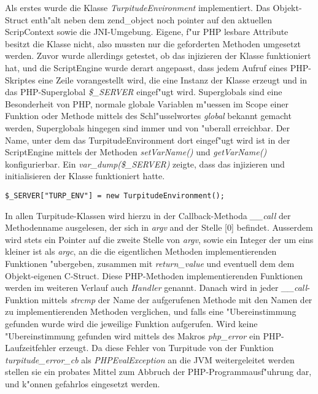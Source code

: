 Als erstes wurde die Klasse \emph{TurpitudeEnvironment} implementiert. Das Objekt-Struct enth"alt neben dem zend\_object noch pointer
auf den aktuellen ScripContext sowie die JNI-Umgebung. Eigene, f"ur PHP lesbare Attribute besitzt die Klasse nicht, also mussten
nur die geforderten Methoden umgesetzt werden. Zuvor wurde allerdings getestet, ob das injizieren der Klasse funktioniert hat, und die
ScriptEngine wurde derart angepasst, dass jedem Aufruf eines PHP-Skriptes eine Zeile vorangestellt wird, die eine Instanz der Klasse
erzeugt und in das PHP-Superglobal \emph{\$\_SERVER} eingef"ugt wird. Superglobals sind eine Besonderheit von PHP, normale globale
Variablen m"uessen im Scope einer Funktion oder Methode mittels des Schl"usselwortes \emph{global} bekannt gemacht werden, Superglobals
hingegen sind immer und von "uberall erreichbar. Der Name, unter dem das TurpitudeEnvironment dort eingef"ugt wird ist in der ScriptEngine
mittels der Methoden \emph{setVarName()} und \emph{getVarName()} konfigurierbar. Ein \emph{var\_dump(\$\_SERVER)} zeigte, dass das
injizieren und initialisieren der Klasse funktioniert hatte.
\begin{lstlisting}[caption=TurpitudeEnvironment in \$\_SERVER einf"ugen]
$_SERVER["TURP_ENV"] = new TurpitudeEnvironment();
\end{lstlisting}
In allen Turpitude-Klassen wird hierzu in der Callback-Methoda \emph{\_\_call} der 
Methodenname ausgelesen, der sich in \emph{argv} and der Stelle [0] befindet. Ausserdem wird stets ein Pointer auf die zweite Stelle
von \emph{argv}, sowie ein Integer der um eins kleiner ist als \emph{argc}, an die die eigentlichen
Methoden implementierenden Funktionen "ubergeben, zusammen mit \emph{return\_value} und eventuell dem dem Objekt-eigenen C-Struct.
Diese PHP-Methoden implementierenden Funktionen werden im weiteren Verlauf auch \emph{Handler} genannt.
Danach wird in jeder \emph{\_\_call}-Funktion mittels \emph{strcmp} der Name der aufgerufenen Methode mit den Namen der zu implementierenden 
Methoden verglichen, und falls eine "Ubereinstimmung gefunden wurde wird die jeweilige Funktion aufgerufen. Wird keine "Ubereinstimmung
gefunden wird mittels des Makros \emph{php\_error} ein PHP-Laufzeitfehler erzeugt. Da diese Fehler von Turpitude von der Funktion
\emph{turpitude\_error\_cb} als \emph{PHPEvalException} an die JVM weitergeleitet werden stellen sie ein probates Mittel zum Abbruch
der PHP-Programmausf"uhrung dar, und k"onnen gefahrlos eingesetzt werden.

